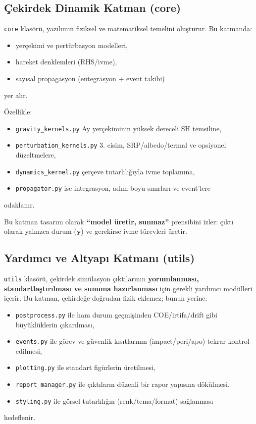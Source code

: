 \subsection{Çekirdek Dinamik Katman (core)}

\texttt{core} klasörü, yazılımın fiziksel ve matematiksel temelini oluşturur.
Bu katmanda:
\begin{itemize}
  \item yerçekimi ve pertürbasyon modelleri,
  \item hareket denklemleri (RHS/ivme),
  \item sayısal propagasyon (entegrasyon + event takibi)
\end{itemize}
yer alır.

Özellikle:
\begin{itemize}
  \item \texttt{gravity\_kernels.py} Ay yerçekiminin yüksek dereceli SH temsiline,
  \item \texttt{perturbation\_kernels.py} 3. cisim, SRP/albedo/termal ve opsiyonel düzeltmelere,
  \item \texttt{dynamics\_kernel.py} çerçeve tutarlılığıyla ivme toplamına,
  \item \texttt{propagator.py} ise integrasyon, adım boyu sınırları ve event’lere
\end{itemize}
odaklanır.

Bu katman tasarım olarak \textbf{“model üretir, sunmaz”} prensibini izler:
çıktı olarak yalnızca durum (\(\mathbf y\)) ve gerekirse ivme türevleri üretir.

\subsection{Yardımcı ve Altyapı Katmanı (utils)}

\texttt{utils} klasörü, çekirdek simülasyon çıktılarının
\textbf{yorumlanması, standartlaştırılması ve sunuma hazırlanması}
için gerekli yardımcı modülleri içerir.
Bu katman, çekirdeğe doğrudan fizik eklemez; bunun yerine:

\begin{itemize}
  \item \texttt{postprocess.py} ile ham durum geçmişinden COE/irtifa/drift gibi büyüklüklerin çıkarılması,
  \item \texttt{events.py} ile görev ve güvenlik kısıtlarının (impact/peri/apo) tekrar kontrol edilmesi,
  \item \texttt{plotting.py} ile standart figürlerin üretilmesi,
  \item \texttt{report\_manager.py} ile çıktıların düzenli bir rapor yapısına dökülmesi,
  \item \texttt{styling.py} ile görsel tutarlılığın (renk/tema/format) sağlanması
\end{itemize}
hedeflenir.

